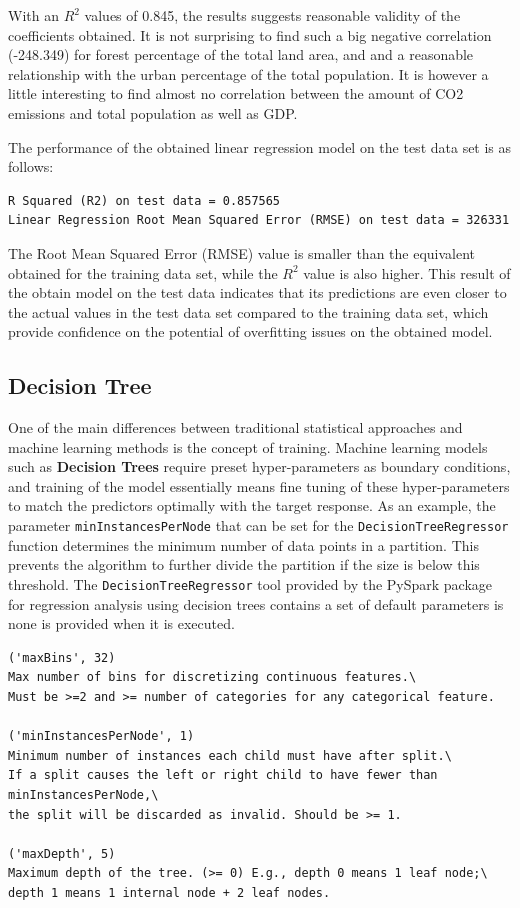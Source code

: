 \documentclass[11pt,a4paper,titlepage]{article}
\begin{document}
With an $R^{2}$ values of 0.845, the results suggests reasonable validity of the coefficients obtained. It is not surprising to find such a big negative correlation (-248.349) for forest percentage of the total land area, and and a reasonable relationship with the urban percentage of the total population. It is however a little interesting to find almost no correlation between the amount of CO2 emissions and total population as well as GDP.

The performance of the obtained linear regression model on the test data set is as follows:

\begin{verbatim}
R Squared (R2) on test data = 0.857565
Linear Regression Root Mean Squared Error (RMSE) on test data = 326331
\end{verbatim}

The Root Mean Squared Error (RMSE) value is smaller than the equivalent obtained for the training data set, while the $R^{2}$ value is also higher. This result of the obtain model on the test data indicates that its predictions are even closer to the actual values in the test data set compared to the training data set, which provide confidence on the potential of overfitting issues on the obtained model.

\subsection{Decision Tree}

One of the main differences between traditional statistical approaches and machine learning methods is the concept of training. Machine learning models such as \textbf{Decision Trees} require preset hyper-parameters as boundary conditions, and training of the model essentially means fine tuning of these hyper-parameters to match the predictors optimally with the target response. As an example, the parameter \texttt{minInstancesPerNode} that can be set for the \texttt{DecisionTreeRegressor} function determines the minimum number of data points in a partition. This prevents the algorithm to further divide the partition if the size is below this threshold. The \texttt{DecisionTreeRegressor} tool provided by the PySpark package for regression analysis using decision trees contains a set of default parameters is none is provided when it is executed.

\begin{verbatim}
('maxBins', 32)
Max number of bins for discretizing continuous features.\
Must be >=2 and >= number of categories for any categorical feature.

('minInstancesPerNode', 1)
Minimum number of instances each child must have after split.\
If a split causes the left or right child to have fewer than minInstancesPerNode,\
the split will be discarded as invalid. Should be >= 1.

('maxDepth', 5)
Maximum depth of the tree. (>= 0) E.g., depth 0 means 1 leaf node;\
depth 1 means 1 internal node + 2 leaf nodes.
\end{verbatim}
\end{document}
